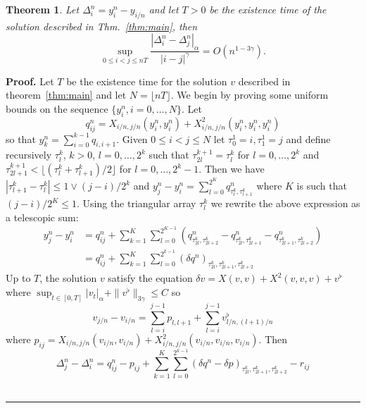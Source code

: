 \documentclass[a4paper,12pt,reqno]{article}
\newcommand{\der}{\delta}
\newtheorem{theorem}{Theorem}
\newenvironment{proof}[1][Proof]{\textbf{#1.} }{\ \rule{0.5em}{0.5em}}
\begin{document}
\begin{theorem}
Let $\Delta^n_i = y^n_i-y_{i/n}$ and let $T>0$ be the existence time of the
solution described in Thm.~\ref{thm:main}, then
\begin{equation}
  \label{eq:euler-bound}
\sup_{0\le i< j\le nT} \frac{|\Delta^n_i-\Delta^n_j|_\alpha}{|i-j|^\gamma} = O(n^{1-3\gamma}) . 
\end{equation}
\end{theorem}

\begin{proof}
Let $T$ be the existence time for the solution $v$ described in theorem~\ref{thm:main} and let $N = \lfloor nT \rfloor$.
We begin by proving some uniform bounds on the sequence
$\{y^n_i,i=0,\dots,N\}$.   Let
$$
q^n_{ij} = X_{i/n, j/n}(y^n_{i},y^n_{i}) + X^2_{i/n, j/n}(y^n_{i},y^n_{i},y^n_{i})
$$
so that $y^n_k =\sum_{i=0}^{k-1} q_{i,i+1}$. Given $0\le i<j\le N$ let
$\tau^1_0=i, \tau^1_1=j$ and define recursively  $\tau^k_l$, $k >
0$, $l =0,\dots,2^k$ such that $\tau^{k+1}_{2l} = \tau^k_l$  for
$l=0,\dots,2^k$ and 
$\tau^{k+1}_{2l+1}<\lfloor (\tau^{k}_{l}+\tau^{k}_{l+1})/2\rfloor$ for
$l=0,\dots,2^k-1$. 
Then we have $|\tau^k_{l+1}-\tau^k_l|\le 1 \vee (j-i)/2^k$
and
$
y^n_j-y^n_i =\sum_{l=0}^{2^K} q^n_{\tau^k_l,\tau^k_{l+1}} 
$
 where $K$ is such that
$(j-i)/2^K \le 1$. Using the triangular array $\tau^k_l$ we 
rewrite the above expression as a telescopic sum:
\begin{equation*}
  \begin{split}
y^n_j-y^n_i & = q^n_{ij} + \sum_{k=1}^K \sum_{l=0}^{2^{K-1}} (q^n_{\tau^k_{2l},\tau^k_{2l+2}}-q^n_{\tau^k_{2l},\tau^k_{2l+1}}-q^n_{\tau^k_{2l+1},\tau^k_{2l+2}}) 
  \\ & = q^n_{ij} + \sum_{k=1}^K \sum_{l=0}^{2^{k-1}} (\der q^n)_{\tau^k_{2l},\tau^k_{2l+1},\tau^k_{2l+2}}   
  \end{split}
\end{equation*}
Up to $T$, the solution $v$ satisfy the equation
$
\der v = X(v,v) + X^2(v,v,v) + v^\flat
$
where $\sup_{t\in[0,T]}|v_t|_\alpha+\|v^\flat\|_{3\gamma}\le C$ so
\begin{equation*}
v_{j/n}-v_{i/n} = \sum_{l=i}^{j-1} p_{l,l+1} + \sum_{l=i}^{j-1} v^\flat_{l/n,(l+1)/n}
\end{equation*}
where $p_{ij}=X_{i/n,j/n}(v_{i/n},v_{i/n})+X^2_{i/n,j/n}(v_{i/n},v_{i/n},v_{i/n})$.
Then
\begin{equation*}
\Delta^n_{j}-\Delta^n_{i} =  q^n_{ij}-p_{ij}  + \sum_{k=1}^K \sum_{l=0}^{2^{k-1}} (\der
q^n- \der p)_{\tau^k_{2l},\tau^k_{2l+1},\tau^k_{2l+2}}  - r_{ij}

\end{equation*}
\end{proof}
\end{document}
